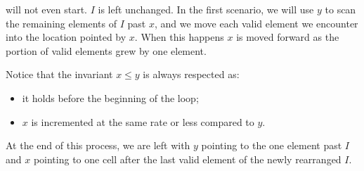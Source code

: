 will not even start. $I$ is left unchanged.
In the first scenario, we will use $y$ to scan the remaining elements of $I$ past $x$, and we move each valid element we encounter 
into the location pointed by $x$. When this happens $x$ is moved forward as the portion of valid elements grew by one element. 

Notice that the invariant $x \leq y$ is always respected as:
\begin{itemize}
	\item it holds before the beginning of the loop;
	\item $x$ is incremented at the same rate or less compared to $y$.
\end{itemize}

At the end of this process, we are left with $y$ pointing to the one element past $I$ and $x$ pointing to one cell after the last valid element of the newly rearranged $I$.